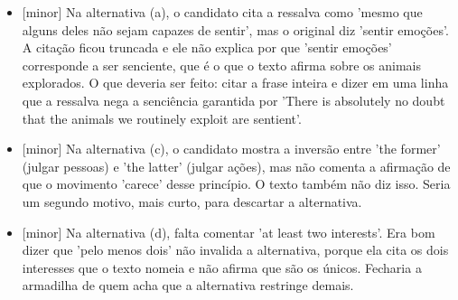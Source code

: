 \documentclass{article}%
\begin{document}
\begin{itemize}%
\item%
{[}minor{]} Na alternativa (a), o candidato cita a ressalva como 'mesmo que alguns deles não sejam capazes de sentir', mas o original diz 'sentir emoções'. A citação ficou truncada e ele não explica por que 'sentir emoções' corresponde a ser senciente, que é o que o texto afirma sobre os animais explorados. O que deveria ser feito: citar a frase inteira e dizer em uma linha que a ressalva nega a senciência garantida por 'There is absolutely no doubt that the animals we routinely exploit are sentient'.%
\item%
{[}minor{]} Na alternativa (c), o candidato mostra a inversão entre 'the former' (julgar pessoas) e 'the latter' (julgar ações), mas não comenta a afirmação de que o movimento 'carece' desse princípio. O texto também não diz isso. Seria um segundo motivo, mais curto, para descartar a alternativa.%
\item%
{[}minor{]} Na alternativa (d), falta comentar 'at least two interests'. Era bom dizer que 'pelo menos dois' não invalida a alternativa, porque ela cita os dois interesses que o texto nomeia e não afirma que são os únicos. Fecharia a armadilha de quem acha que a alternativa restringe demais.%
\end{itemize}%
\end{document}
